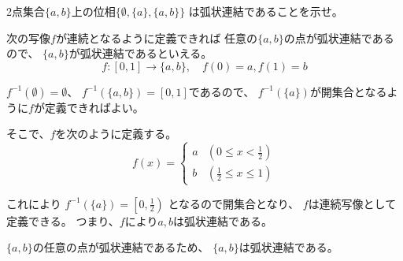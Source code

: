 \documentclass[12pt,b5paper]{ltjsarticle}
\begin{document}
\begin{enumerate}
       2点集合$\{a,b\}$上の位相$\{ \emptyset , \{a\}, \{a,b\} \}$
       は弧状連結であることを示せ。

       \dotfill

       次の写像$f$が連続となるように定義できれば
       任意の$\{a,b\}$の点が弧状連結であるので、
       $\{a,b\}$が弧状連結であるといえる。
       \begin{equation}
        f: [0,1]\to \{a,b\},\quad
         f(0)=a,f(1)=b
       \end{equation}

       $f^{-1}(\emptyset)=\emptyset$、
       $f^{-1}(\{a,b\})=[0,1]$であるので、
       $f^{-1}(\{a\})$が開集合となるように$f$が定義できればよい。

       そこで、$f$を次のように定義する。
       \begin{equation}
        f(x)=
        \begin{cases}
         a & (0\leq x< \frac{1}{2})\\
         b & (\frac{1}{2} \leq x\leq 1)
        \end{cases}
       \end{equation}

       これにより
       $f^{-1}(\{a\})=\left[0,\frac{1}{2}\right)$
       となるので開集合となり、
       $f$は連続写像として定義できる。
       つまり、$f$により$a,b$は弧状連結である。

       $\{a,b\}$の任意の点が弧状連結であるため、
       $\{a,b\}$は弧状連結である。
       


\end{enumerate}

\hrulefill
\end{document}
